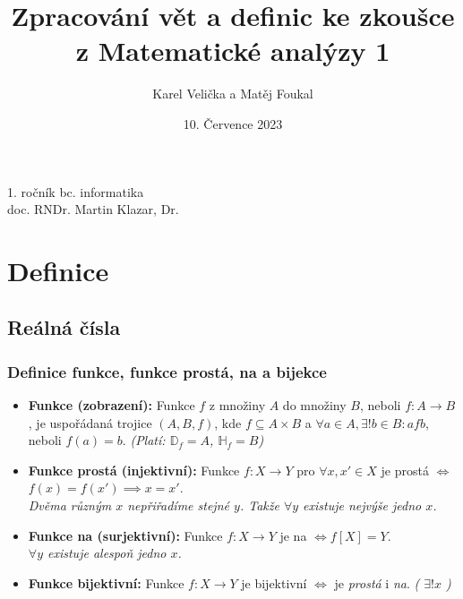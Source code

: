\documentclass[10pt,a4paper]{article}
\title{Zpracování vět a definic ke zkoušce z Matematické analýzy 1}
\date{10. Července 2023}
\author{Karel Velička a Matěj Foukal}
\begin{document}
\maketitle

\begin{center}
    1. ročník bc. informatika\\ doc. RNDr. Martin Klazar, Dr.
\end{center}


\tableofcontents

\newpage


\section{Definice}

\subsection{Reálná čísla}

\subsubsection{Definice funkce, funkce prostá, na a bijekce}

\begin{itemize}
    \item \textbf{Funkce (zobrazení):} Funkce $f$ z množiny $A$ do množiny $B$, neboli $f:A\to B$, je uspořádaná trojice $(A, B, f)$, kde $f\subseteq A\times B$ a  \(\forall a \in A, \exists ! b\in B: afb\), neboli $f(a) = b$. \textit{(Platí: $\mathbb{D}_f = A$, $\mathbb{H}_f = B$)}
    \item \textbf{Funkce prostá (injektivní):} Funkce $f: X\to Y$ pro $\forall x,x' \in X$ je prostá $\iff$ $f(x) = f(x') \implies  x = x'$. \\ \textit{Dvěma různým $x$ nepřiřadíme stejné $y$. Takže $\forall y$ existuje nejvýše jedno $x$.}
    \item \textbf{Funkce na (surjektivní):} Funkce $f: X\to Y$ je na $\iff f[X] = Y$. \\ \textit{$\forall y$ existuje alespoň jedno $x$.}
    \item \textbf{Funkce bijektivní:} Funkce $f: X\to Y$ je bijektivní $\iff$ je \textit{prostá} i \textit{na}. \textit{( $\exists !x$ )}
\end{itemize}
\end{document}
